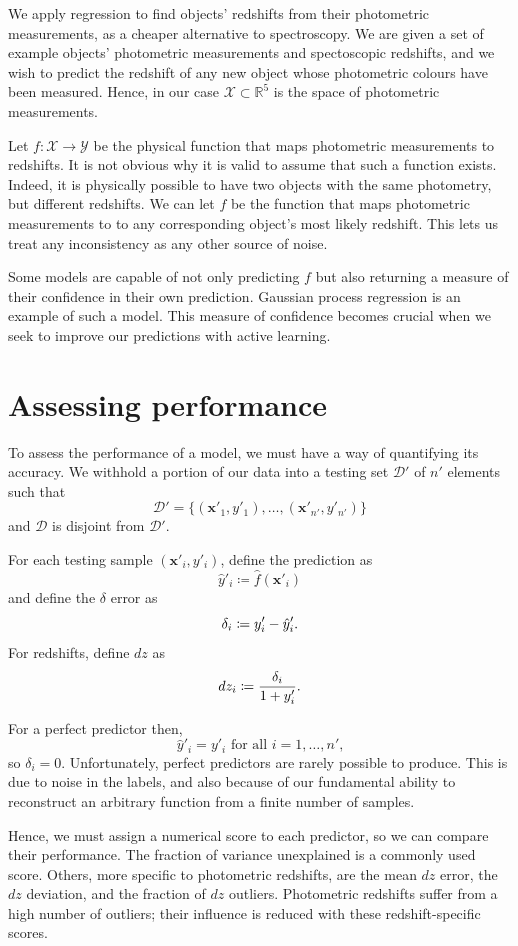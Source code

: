 \documentclass[11pt,twoside,openright]{report}
\newcommand\bbR{\mathbb{R}}
\newcommand\bx{\mathbf{x}}
\newcommand\cD{\mathcal{D}}
\newcommand\cX{\mathcal{X}}
\newcommand\cY{\mathcal{Y}}
\begin{document}
We apply regression to find objects' redshifts from their photometric measurements, as a cheaper alternative to spectroscopy. We are given a set of example objects' photometric measurements and spectoscopic redshifts, and we wish to predict the redshift of any new object whose photometric colours have been measured. Hence, in our case $\cX \subset \bbR^5$ is the space of photometric measurements.

Let $f : \cX \to \cY$ be the physical function that maps photometric measurements to redshifts. It is not obvious why it is valid to assume that such a function exists. Indeed, it is physically possible to have two objects with the same photometry, but different redshifts. We can let $f$ be the function that maps photometric measurements to to any corresponding object's most likely redshift. This lets us treat any inconsistency as any other source of noise.

Some models are capable of not only predicting $f$ but also returning a measure of their confidence in their own prediction. Gaussian process regression is an example of such a model. This measure of confidence becomes crucial when we seek to improve our predictions with active learning.

\section{Assessing performance}

To assess the performance of a model, we must have a way of quantifying its accuracy. We withhold a portion of our data into a testing set $\cD'$ of $n'$ elements such that \[
  \cD' = \{(\bx'_1, y'_1), \dots, (\bx'_{n'}, y'_{n'})\}
\] and $\cD$ is disjoint from $\cD'$.

For each testing sample $(\bx'_i, y'_i)$, define the prediction as\[
  \hat y'_i \coloneqq \hat f(\bx'_i)
\] and define the $\delta$ error as \[
  \delta_i \coloneqq y'_i - \hat y'_i\text.
\] For redshifts, define $dz$ as \[
  dz_i \coloneqq \frac{\delta_i}{1 + y'_i} \text.
\]

For a perfect predictor then,\[
  \hat y'_i = y'_i \text{ for all }i=1, \dots, n'\text{,}
\] so $\delta_i = 0$. Unfortunately, perfect predictors are rarely possible to produce. This is due to noise in the labels, and also because of our fundamental ability to reconstruct an arbitrary function from a finite number of samples.

Hence, we must assign a numerical score to each predictor, so we can compare their performance. The fraction of variance unexplained is a commonly used score. Others, more specific to photometric redshifts, are the mean $dz$ error, the $dz$ deviation, and the fraction of $dz$ outliers. Photometric redshifts suffer from a high number of outliers; their influence is reduced with these redshift-specific scores.
\end{document}
